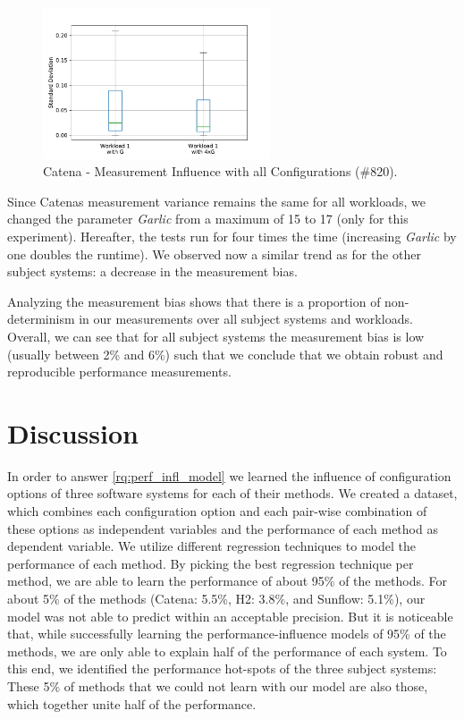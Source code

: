 \begin{figure}[h]
  \centering
  \includegraphics[width=0.6\textwidth]{images/catena_m_infl_wl_and_wlx4_0}
  \caption{Catena - Measurement Influence with all Configurations (\#820).}
  \label{box_measure_infl_catena_x4}
\end{figure}

Since Catenas measurement variance remains the same for all workloads, we changed the parameter \textit{Garlic} from a maximum of 15 to 17 (only for this experiment). Hereafter, the tests run for four times the time (increasing \textit{Garlic} by one doubles the runtime). We observed now a similar trend as for the other subject systems: a decrease in the measurement bias.

Analyzing the measurement bias shows that there is a proportion of non-determinism in our measurements over all subject systems and workloads. Overall, we can see that for all subject systems the measurement bias is low (usually between 2\% and 6\%) such that we conclude that we obtain robust and reproducible performance measurements.



\clearpage

\section{Discussion}
\label{discussion}



In order to answer \ref{rq:perf_infl_model} we learned the influence of configuration options of three software systems for each of their methods. We created a dataset, which combines each configuration option and each pair-wise combination of these options as independent variables and the performance of each method as dependent variable. We utilize different regression techniques to model the performance of each method. By picking the best regression technique per method, we are able to learn the performance of about 95\% of the methods. For about 5\% of the methods (Catena: 5.5\%, H2: 3.8\%, and Sunflow: 5.1\%), our model was not able to predict within an acceptable precision. 
But it is noticeable that, while successfully learning the performance-influence models of 95\% of the methods, we are only able to explain half of the performance of each system. To this end, we identified the performance hot-spots of the three subject systems: These 5\% of methods that we could not learn with our model are also those, which together unite half of the performance. 


